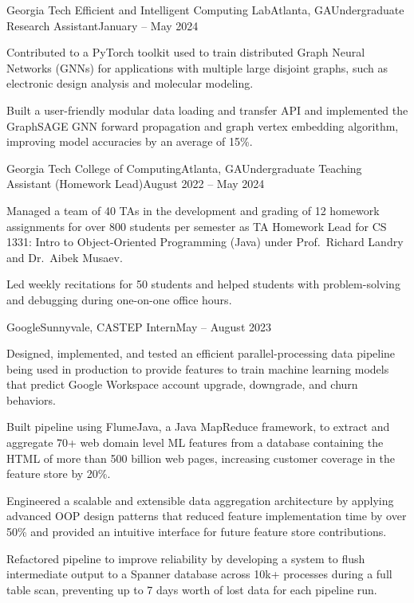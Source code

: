 \documentclass{article}
\begin{document}
\begin{flushleft}
    \begin{experience}{Georgia Tech Efficient and Intelligent Computing Lab}{Atlanta, GA}{Undergraduate Research Assistant}{January -- May 2024}
        \item Contributed to a PyTorch toolkit used to train distributed Graph Neural Networks (GNNs) for applications with multiple large disjoint graphs, such as electronic design analysis and molecular modeling.
        \item Built a user-friendly modular data loading and transfer API and implemented the GraphSAGE GNN forward propagation and graph vertex embedding algorithm, improving model accuracies by an average of 15\%.
    \end{experience}

    \begin{experience}{Georgia Tech College of Computing}{Atlanta, GA}{Undergraduate Teaching Assistant (Homework Lead)}{August 2022 -- May 2024}
        \item Managed a team of 40 TAs in the development and grading of 12 homework assignments for over 800 students per semester as TA Homework Lead for CS 1331: Intro to Object-Oriented Programming (Java) under Prof.~Richard Landry and Dr.~Aibek Musaev.
        \item Led weekly recitations for 50 students and helped students with problem-solving and debugging during one-on-one office hours.
    \end{experience}

    \begin{experience}{Google}{Sunnyvale, CA}{STEP Intern}{May -- August 2023}
        \item Designed, implemented, and tested an efficient parallel-processing data pipeline being used in production to provide features to train machine learning models that predict Google Workspace account upgrade, downgrade, and churn behaviors.
        \item Built pipeline using FlumeJava, a Java MapReduce framework, to extract and aggregate 70+ web domain level ML features from a database containing the HTML of more than 500 billion web pages, increasing customer coverage in the feature store by 20\%.
        \item Engineered a scalable and extensible data aggregation architecture by applying advanced OOP design patterns that reduced feature implementation time by over 50\% and provided an intuitive interface for future feature store contributions.
        \item Refactored pipeline to improve reliability by developing a system to flush intermediate output to a Spanner database across 10k+ processes during a full table scan, preventing up to 7 days worth of lost data for each pipeline run.
    \end{experience}


\end{flushleft}
\end{document}
